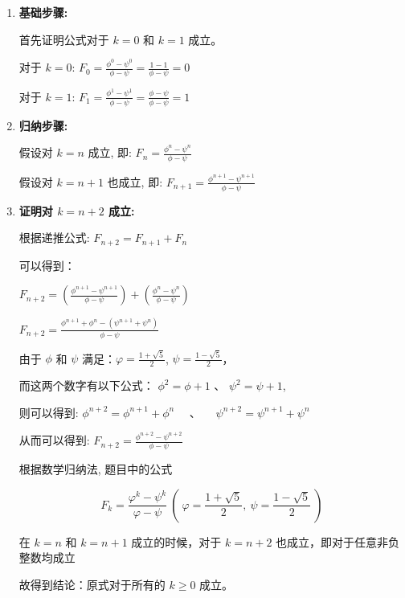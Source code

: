 \documentclass{article}
\begin{document}
	\begin{enumerate}
		\item \textbf{基础步骤:} 
		
		首先证明公式对于 $k=0$ 和 $k=1$ 成立。
		
		对于 $k=0$: 
		$
		F_0 = \frac{\phi^0 - \psi^0}{\phi - \psi} = \frac{1 - 1}{\phi - \psi} = 0
		$
		
		对于 $k=1$: 
		$
		F_1 = \frac{\phi^1 - \psi^1}{\phi - \psi} = \frac{\phi - \psi}{\phi - \psi} = 1
		$
		
		\item \textbf{归纳步骤:} 
		
		假设对 $k=n$ 成立, 即: 
		$
		F_n = \frac{\phi^n - \psi^n}{\phi - \psi}
		$
		
		假设对 $k=n+1$ 也成立, 即: 
		$
		F_{n+1} = \frac{\phi^{n+1} - \psi^{n+1}}{\phi - \psi}
		$
		
		\item \textbf{证明对 $k=n+2$ 成立:}
		
		根据递推公式:
		$
		F_{n+2} = F_{n+1} + F_n
		$
		
		可以得到：
		
		$
		F_{n+2} = \left( \frac{\phi^{n+1} - \psi^{n+1}}{\phi - \psi} \right) + \left( \frac{\phi^n - \psi^n}{\phi - \psi} \right)
		$
		
		$
		F_{n+2} = \frac{\phi^{n+1} + \phi^n - (\psi^{n+1} + \psi^n)}{\phi - \psi}
		$
		
		由于 $\phi$ 和 $\psi$ 满足：$\varphi = \frac{1 + \sqrt{5}}{2}$, $\psi = \frac{1 - \sqrt{5}}{2}$，
		
		而这两个数字有以下公式： $\phi^2 = \phi + 1$ 、 $\psi^2 = \psi + 1$, 
		
		则可以得到:
		$
		\phi^{n+2} = \phi^{n+1} + \phi^n \quad $ 、 $ \quad \psi^{n+2} = \psi^{n+1} + \psi^n
		$
		
		从而可以得到:
		$
		F_{n+2} = \frac{\phi^{n+2} - \psi^{n+2}}{\phi - \psi}
		$
		
		根据数学归纳法, 题目中的公式
		
		$$
		F_k = \frac{\varphi^k - \psi^k}{\varphi - \psi} \ (\ \varphi = \frac{1 + \sqrt{5}}{2},\ \psi = \frac{1 - \sqrt{5}}{2}\ )
		$$
		
		在 $k = n$ 和 $k = n+1$ 成立的时候，对于 $k = n+2$ 也成立，即对于任意非负整数均成立
		
		故得到结论：原式对于所有的 $k \geq 0$ 成立。
	\end{enumerate}
	
\end{document}
